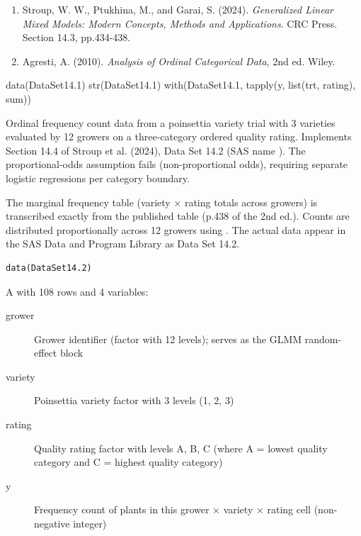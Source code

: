 \documentclass[a4paper]{book}
\begin{document}
%
\begin{References}
\begin{enumerate}

\item{} Stroup, W. W., Ptukhina, M., and Garai, S. (2024).
\emph{Generalized Linear Mixed Models: Modern Concepts,
Methods and Applications}. CRC Press. Section 14.3, pp.434-438.
\item{} Agresti, A. (2010). \emph{Analysis of Ordinal Categorical Data},
2nd ed. Wiley.

\end{enumerate}

\end{References}
%
\begin{SeeAlso}
\end{SeeAlso}
%
\begin{Examples}
\begin{ExampleCode}
data(DataSet14.1)
str(DataSet14.1)
with(DataSet14.1, tapply(y, list(trt, rating), sum))
\end{ExampleCode}
\end{Examples}
%
\begin{Description}
Ordinal frequency count data from a poinsettia variety trial with 3 varieties
evaluated by 12 growers on a three-category ordered quality rating.  Implements
Section 14.4 of Stroup et al. (2024), Data Set 14.2 (SAS name
).  The proportional-odds assumption fails (non-proportional
odds), requiring separate logistic regressions per category boundary.

 The marginal frequency table
(variety × rating totals across growers) is transcribed exactly from the
published table (p.438 of the 2nd ed.).  Counts are distributed
proportionally across 12 growers using .  The actual
data appear in the SAS Data and Program Library as Data Set 14.2.
\end{Description}
%
\begin{Usage}
\begin{verbatim}
data(DataSet14.2)
\end{verbatim}
\end{Usage}
%
\begin{Format}
A  with 108 rows and 4 variables:
\begin{description}

\item[grower] Grower identifier (factor with 12 levels); serves as the
GLMM random-effect block
\item[variety] Poinsettia variety factor with 3 levels (1, 2, 3)
\item[rating] Quality rating factor with levels A, B, C (where A = lowest
quality category and C = highest quality category)
\item[y] Frequency count of plants in this grower × variety × rating cell
(non-negative integer)

\end{description}

\end{Format}
\end{document}
